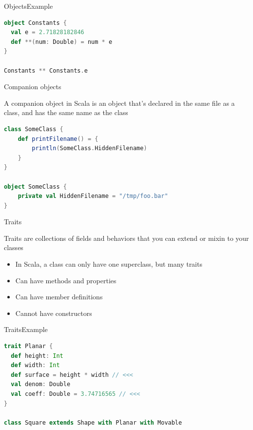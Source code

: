 \documentclass[aspectratio=169]{beamer}
\begin{document}
\begin{frame}[fragile]{Objects}{Example}
\begin{lstlisting}[style=scala,language=scala]
object Constants {
  val e = 2.71828182846
  def **(num: Double) = num * e
}

Constants ** Constants.e
\end{lstlisting}
\end{frame}

\begin{frame}[fragile]{Companion objects}
\begin{block}{}
  A companion object in Scala is an object that’s declared in the same file as a class, and has the
  same name as the class
\end{block}
 \vspace{1em}
\begin{lstlisting}[style=scala,language=scala]
class SomeClass {
    def printFilename() = {
        println(SomeClass.HiddenFilename)
    }
}

object SomeClass {
    private val HiddenFilename = "/tmp/foo.bar"
}
\end{lstlisting}
\end{frame}

\begin{frame}{Traits}
  \begin{block}{}
    Traits are collections of fields and behaviors that you can extend or mixin to your classes
  \end{block}
  \begin{itemize}
    \item In Scala, a class can only have one superclass, but many traits
    \item Can have methods and properties
    \item \alert{Can have} member definitions
    \item \alert{Cannot}  have constructors
  \end{itemize}
\end{frame}

\begin{frame}[fragile]{Traits}{Example}
\begin{lstlisting}[style=scala,language=scala]
trait Planar {
  def height: Int
  def width: Int
  def surface = height * width // <<<
  val denom: Double
  val coeff: Double = 3.74716565 // <<<
}

class Square extends Shape with Planar with Movable
\end{lstlisting}
\end{frame}
\end{document}
